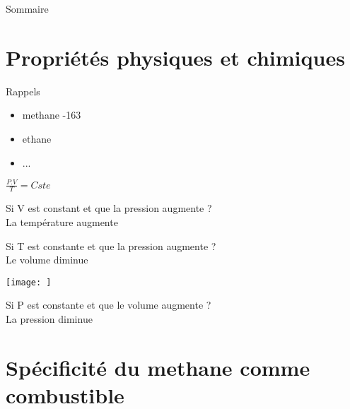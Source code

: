 \documentclass[xcolor=dvipsnames,hyperref={breaklinks=true},mathserif,
professionalfont,12pt]{beamer}
\author{Cyrille Reggio}
\begin{document}
    
    \begin{frame}{Sommaire}
        \tableofcontents
    \end{frame}

 \section{Propriétés physiques et chimiques}
\begin{frame}{Rappels}
 \begin{itemize}
  \item methane -163
  \item ethane
  \item ...
 \end{itemize}

\end{frame}

\begin{frame}
\centering

\large
 $\frac{P.V}{T}=Cste$
\end{frame}

\begin{frame}
 Si V est constant et que la pression augmente ?\\
 \pause La température augmente
\end{frame}

\begin{frame}
 Si T est constante et que la pression augmente ?\\
 \pause Le volume diminue
\end{frame}

\begin{frame}
    \texttt{[image: ]}
\end{frame}

\begin{frame}
 Si P est constante et que le volume augmente ?\\
 \pause La pression diminue
\end{frame}

\section{Spécificité du methane comme combustible}

\begin{frame}
 
\end{frame}

\end{document}
